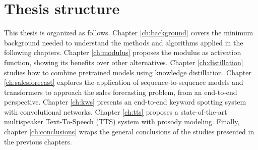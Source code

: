 \section{Thesis structure}
This thesis is organized as follows. Chapter \ref{ch:background} covers the minimum background needed to understand the methods and algorithms applied in the following chapters. Chapter \ref{ch:modulus} proposes the modulus as activation function, showing its benefits over other alternatives. Chapter \ref{ch:distillation} studies how to combine pretrained models using knowledge distillation. Chapter \ref{ch:salesforecast} explores the application of sequence-to-sequence models and transformers to approach the sales forecasting problem, from an end-to-end perspective. Chapter \ref{ch:kws} presents an end-to-end keyword spotting system with convolutional networks. Chapter \ref{ch:tts} proposes a state-of-the-art multispeaker Text-To-Speech (TTS) system with prosody modeling. Finally, chapter \ref{ch:conclusions} wraps the general conclusions of the studies presented in the previous chapters.


